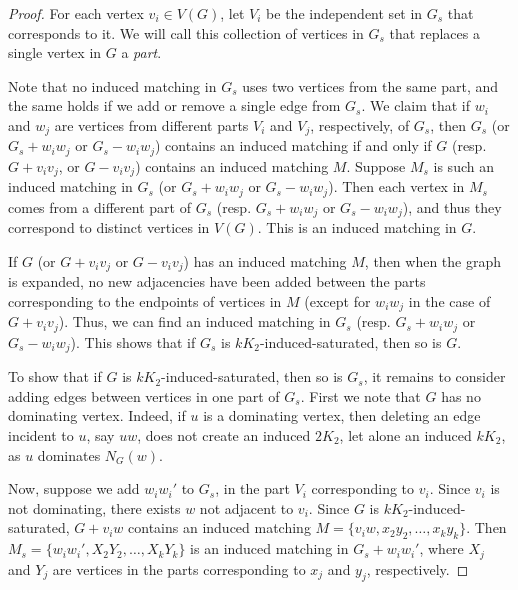 \documentclass[12pt]{amsart}
\theoremstyle{plain}
\theoremstyle{definition}
\theoremstyle{remark}
\begin{document}
\begin{proof}
For each vertex $v_i \in V(G)$, let $V_i$ be the independent set in $G_s$ that corresponds to it.
We will call this collection of vertices in $G_s$ that replaces a single vertex in $G$ a \emph{part}.

Note that %
no induced matching in $G_s$ uses two vertices from the same part, and the same holds if we add or remove a single edge from $G_s$.
We claim that if $w_i$ and $w_j$ are vertices from different parts $V_i$ and $V_j$, respectively, of $G_s$, then $G_s$ (or  $G_s+w_iw_j$ or $G_s-w_iw_j$) contains an induced matching %
if and only if $G$ (resp. $G+v_iv_j$, or $G-v_iv_j$) contains an induced matching $M$.
Suppose $M_s$ is such an induced matching in $G_s$ (or $G_s+w_iw_j$ or $G_s-w_iw_j$). Then each vertex in $M_s$ comes from a different part of $G_s$ (resp. $G_s+w_iw_j$ or $G_s-w_iw_j$), and thus they correspond to distinct vertices in $V(G)$.
This is an induced matching in $G$.

If $G$ (or $G+v_iv_j$ or $G-v_iv_j$) has an induced matching $M$, then when the graph is expanded, no new adjacencies have been added between the parts corresponding to the endpoints of vertices in $M$ (except for $w_iw_j$ in the case of $G+v_iv_j$).  Thus, we can find an induced matching in $G_s$ (resp. $G_s+w_iw_j$ or $G_s-w_iw_j$).
This shows that if $G_s$ is $kK_2$-induced-saturated, then so is $G$.

To show that if $G$ is $kK_2$-induced-saturated, then so is $G_s$, it remains to consider adding edges between vertices in one part of $G_s$.  First we note that $G$ has no dominating vertex. Indeed, if $u$ is a dominating vertex, then deleting an edge incident to $u$, say $uw$, does not create an induced $2K_2$, let alone an induced $kK_2$, as $u$ dominates $N_G(w)$.

Now, suppose we add $w_iw_i'$ to $G_s$, in the part $V_i$ corresponding to $v_i$.
Since $v_i$ is not dominating, there exists $w$ not adjacent to $v_i$.  Since $G$ is $kK_2$-induced-saturated, $G+v_iw$ contains an induced matching $M=\{v_iw,x_2y_2,\ldots,x_ky_k\}$. Then $M_s=\{w_iw_i',X_2Y_2,\ldots,X_kY_k\}$ is an induced matching in $G_s+w_iw_i'$, where $X_j$ and $Y_j$ are vertices in the parts corresponding to $x_j$ and $y_j$, respectively.
\end{proof}
\end{document}
